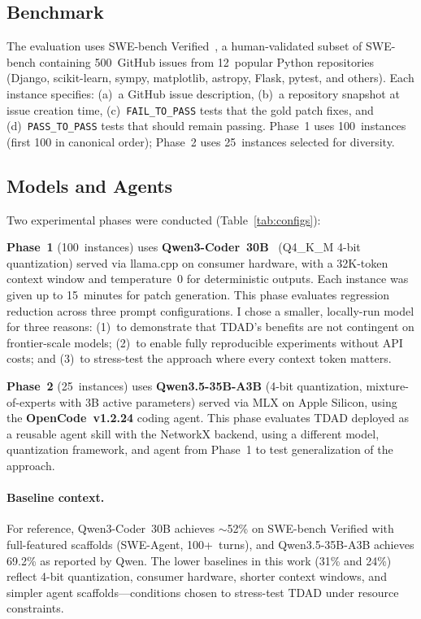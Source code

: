 \documentclass[sigconf,nonacm]{acmart}
\begin{document}
\subsection{Benchmark}

The evaluation uses SWE-bench Verified~\cite{jimenez2024swebench}, a human-validated
subset of SWE-bench containing 500~GitHub issues from 12~popular Python
repositories (Django, scikit-learn, sympy, matplotlib, astropy, Flask, pytest,
and others).  Each instance specifies: (a)~a GitHub issue description,
(b)~a repository snapshot at issue creation time, (c)~\texttt{FAIL\_TO\_PASS}
tests that the gold patch fixes, and (d)~\texttt{PASS\_TO\_PASS} tests that
should remain passing.  Phase~1 uses 100~instances (first 100 in canonical
order); Phase~2 uses 25~instances selected for diversity.

\subsection{Models and Agents}

Two experimental phases were conducted (Table~\ref{tab:configs}):

\textbf{Phase~1} (100~instances) uses \textbf{Qwen3-Coder~30B}~\cite{qwen2025qwen3coder} (Q4\_K\_M 4-bit quantization) served via llama.cpp on
consumer hardware, with a 32K-token context window and temperature~0 for
deterministic outputs.  Each instance was given up to 15~minutes for patch
generation.  This phase evaluates regression reduction across three prompt
configurations.  I chose a smaller, locally-run model for three reasons:
(1)~to demonstrate that \textsc{TDAD}'s benefits are not contingent on
frontier-scale models; (2)~to enable fully reproducible experiments without
API costs; and (3)~to stress-test the approach where every context token
matters.

\textbf{Phase~2} (25~instances) uses \textbf{Qwen3.5-35B-A3B} (4-bit
quantization, mixture-of-experts with 3B active parameters) served via MLX
on Apple Silicon, using the \textbf{OpenCode~v1.2.24} coding agent.  This
phase evaluates \textsc{TDAD} deployed as a reusable agent skill with the
NetworkX backend, using a different model, quantization framework, and agent
from Phase~1 to test generalization of the approach.

\paragraph{Baseline context.}
For reference, Qwen3-Coder~30B achieves ${\sim}$52\% on SWE-bench Verified
with full-featured scaffolds (SWE-Agent, 100+~turns), and Qwen3.5-35B-A3B
achieves 69.2\% as reported by Qwen.  The lower baselines in this work
(31\% and 24\%) reflect 4-bit quantization, consumer hardware, shorter
context windows, and simpler agent scaffolds---conditions chosen to
stress-test \textsc{TDAD} under resource constraints.
\end{document}
